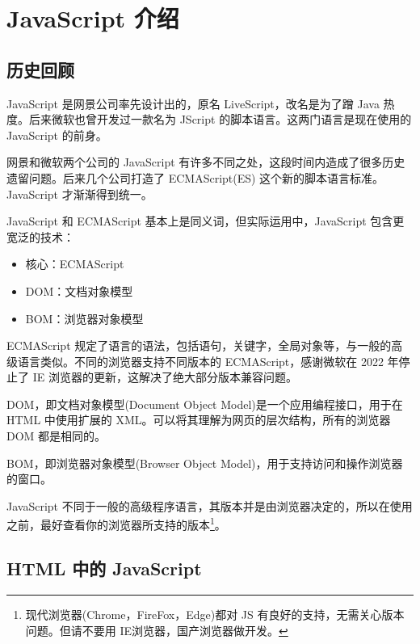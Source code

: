 \section{JavaScript 介绍}
\subsection{历史回顾}

JavaScript 是网景公司率先设计出的，原名 LiveScript，改名是为了蹭 Java 热度。后来微软也曾开发过一款名为 JScript 的脚本语言。这两门语言是现在使用的 JavaScript 的前身。

网景和微软两个公司的 JavaScript 有许多不同之处，这段时间内造成了很多历史遗留问题。后来几个公司打造了 ECMAScript(ES) 这个新的脚本语言标准。JavaScript 才渐渐得到统一。

JavaScript 和 ECMAScript 基本上是同义词，但实际运用中，JavaScript 包含更宽泛的技术：
\begin{itemize}
    \item 核心：ECMAScript
    \item DOM：文档对象模型
    \item BOM：浏览器对象模型
\end{itemize}

ECMAScript 规定了语言的语法，包括语句，关键字，全局对象等，与一般的高级语言类似。不同的浏览器支持不同版本的 ECMAScript，感谢微软在 2022 年停止了 IE 浏览器的更新，这解决了绝大部分版本兼容问题。

DOM，即文档对象模型(Document Object Model)是一个应用编程接口，用于在 HTML 中使用扩展的 XML。可以将其理解为网页的层次结构，所有的浏览器 DOM 都是相同的。

BOM，即浏览器对象模型(Browser Object Model)，用于支持访问和操作浏览器的窗口。

JavaScript 不同于一般的高级程序语言，其版本并是由浏览器决定的，所以在使用之前，最好查看你的浏览器所支持的版本\footnote{现代浏览器(Chrome，FireFox，Edge)都对 JS 有良好的支持，无需关心版本问题。但请不要用 IE浏览器，国产浏览器做开发。}。

\subsection{HTML 中的 JavaScript}
 
